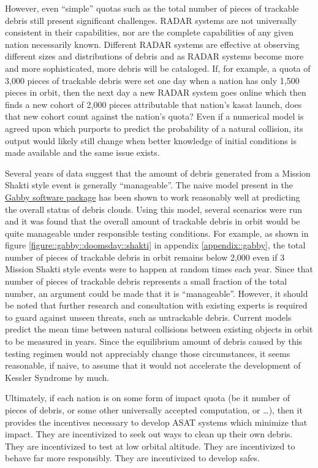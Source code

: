 However, even ``simple'' quotas such as the total number of pieces of
trackable debris still present significant challenges.  RADAR systems
are not universally consistent in their
capabilities\cite[T4]{cpl-oreilly}, nor are the complete capabilities
of any given nation necessarily known. Different RADAR systems are
effective at observing different sizes and distributions of debris and
as RADAR systems become more and more sophisticated, more debris will
be cataloged.  If, for example, a quota of 3,000 pieces of trackable
debris were set one day when a nation has only 1,500 pieces in orbit,
then the next day a new RADAR system goes online which then finds a
new cohort of 2,000 pieces attributable that nation's \ac{kasat}
launch, does that new cohort count against the nation's quota?  Even
if a numerical model is agreed upon which purports to predict the
probability of a natural collision, its output would likely still
change when better knowledge of initial conditions is made available
and the same issue exists.

Several years of data suggest that the amount of debris generated from
a Mission Shakti style event is generally ``manageable''.  The naive
model present in the
\href{https://github.com/harrison-caudill/gabby}{Gabby software
  package} has been shown to work reasonably well at predicting the
overall status of debris clouds.\cite{gabby} Using this model, several
scenarios were run and it was found that the overall amount of
trackable debris in orbit would be quite manageable under responsible
testing conditions.  For example, as shown in figure
\ref{figure::gabby::doomsday::shakti} in appendix
\ref{appendix::gabby}, the total number of pieces of trackable debris
in orbit remains below 2,000 even if 3 Mission Shakti style events
were to happen at random times each year.  Since that number of pieces
of trackable debris represents a small fraction of the total number,
an argument could be made that it is ``manageable''.  However, it
should be noted that further research and consultation with existing
experts is required to guard against unseen threats, such as
untrackable debris.  Current models predict the mean time between
natural collisions between existing objects in orbit to be measured in
years.\cite[p6]{kessler-reunion} Since the equilibrium amount of
debris caused by this testing regimen would not appreciably change
those circumstances, it seems reasonable, if naive, to assume that it
would not accelerate the development of Kessler Syndrome by much.

Ultimately, if each nation is on some form of impact quota (be it
number of pieces of debris, or some other universally accepted
computation, or \ldots), then it provides the incentives necessary to
develop ASAT systems which minimize that impact.  They are
incentivized to seek out ways to clean up their own debris.  They are
incentivized to test at low orbital altitude.  They are incentivized
to behave far more responsibly.  They are incentivized to develop
\acp{safe}.

